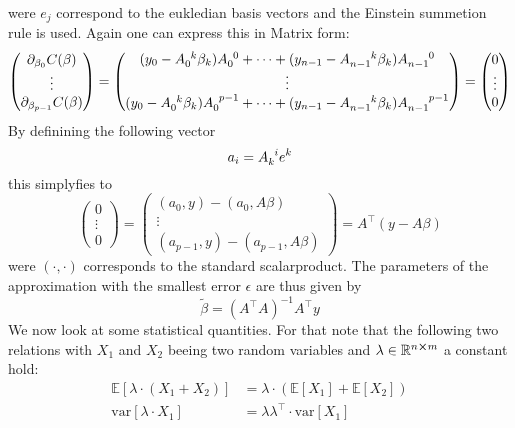 \documentclass[12pt]{scrartcl}
\begin{document}
  were $e_j$ correspond to the eukledian basis vectors and the Einstein summetion rule is used.
  Again one can express this in Matrix form:
  \begin{equation}
  	\begin{pmatrix} \partial_{\beta_{0}} C(\beta) \\ \vdots \\ \partial_{\beta_{p-1}} C(\beta) \end{pmatrix}
  	=
  	\begin{pmatrix}
  		(y_0 - \tensor{A}{_0^k} \beta_k) \tensor{A}{_0^0} + \cdots + (y_{n-1} - \tensor{A}{_{n-1}^k}\beta_k)\tensor{A}{_{n-1}^0} \\
  		\vdots \\
  		(y_0 - \tensor{A}{_0^k} \beta_k) \tensor{A}{_0^{p-1}} + \cdots + (y_{n-1} - \tensor{A}{_{n-1}^k}\beta_k)\tensor{A}{_{n-1}^{p-1}}
  	\end{pmatrix}
    =
    \begin{pmatrix} 0 \\ \vdots \\ 0 \end{pmatrix}
  \end{equation}
  By definining the following vector 
  \begin{equation}
  	a_i = \tensor{A}{_k^i}e^k
  \end{equation}
  this simplyfies to
  \begin{equation}
  	 \begin{pmatrix} 0 \\ \vdots \\ 0 \end{pmatrix} =
  	\begin{pmatrix}
  		(a_0,y) - (a_0,A\beta) \\
  		\vdots \\
  		(a_{p-1},y) - (a_{p-1},A\beta)
  	\end{pmatrix}
  	= A^\top(y-A\beta)
  \end{equation}
  were $(\cdot,\cdot)$ corresponds to the standard scalarproduct.
  The parameters of the approximation with the smallest error $\epsilon$ are thus given by
  \begin{equation}
  	 \tilde{\beta} = (A^\top A)^{-1} A^\top y
  \end{equation}
  We now look at some statistical quantities.
  For that note that the following two relations with $X_1$ and $X_2$ beeing two random variables and $\lambda\in\mathbb{R}^{n\cross m}$ a constant hold:
  \begin{align}
  	\label{eq: l_ex}
  	\mathbb{E}[\lambda\cdot (X_1+X_2)] &= \lambda \cdot (\mathbb{E}[X_1] + \mathbb{E}[X_2]) \\
  	\label{eq: l_var}
  	\text{var}[\lambda\cdot X_1] &= \lambda \lambda^\top \cdot \text{var}[X_1]
  \end{align}
\end{document}
